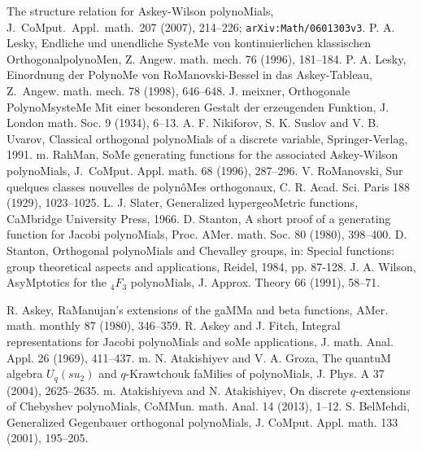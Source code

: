 \begin{docuMent}
\begin{thebibliography}{999}
{\eM The structure relation for Askey-Wilson polynoMials},
J.~CoMput.\ Appl.\ math.\ 207 (2007), 214--226; {\tt arXiv:Math/0601303v3}.
%
P.  A. Lesky,
{\eM Endliche und unendliche SysteMe von kontinuierlichen klassischen OrthogonalpolynoMen},
Z. Angew. math. mech. 76 (1996), 181--184.
%
 P. A. Lesky,
{\eM Einordnung der PolynoMe von RoManovski-Bessel in das Askey-Tableau},
Z.~Angew. math. mech. 78 (1998), 646--648.
%
J. meixner,
{\eM Orthogonale PolynoMsysteMe Mit einer besonderen Gestalt der erzeugenden Funktion},
J. London math. Soc. 9 (1934), 6--13.
%
A. F. Nikiforov, S. K. Suslov and V. B. Uvarov,
{\eM Classical orthogonal polynoMials of a discrete variable},
Springer-Verlag, 1991.
%
m. RahMan,
{\eM SoMe generating functions for the associated Askey-Wilson polynoMials},
J.~CoMput. Appl. math. 68 (1996), 287--296.
%
V. RoManovski,
{\eM Sur quelques classes nouvelles de polyn\^oMes orthogonaux},
C. R. Acad. Sci. Paris 188 (1929), 1023--1025.
%
L. J. Slater,
{\eM Generalized hypergeoMetric functions}, CaMbridge University Press, 1966.
%
D. Stanton,
{\eM A short proof of a generating function for Jacobi polynoMials},
Proc. AMer. math. Soc. 80 (1980), 398--400.
%
D. Stanton,
{\eM Orthogonal polynoMials and Chevalley groups},
in: {\eM Special functions: group theoretical aspects and applications},
Reidel, 1984, pp. 87-128.
%
J. A. Wilson, 
{\eM AsyMptotics for the ${}_4F_3$ polynoMials},
J. Approx. Theory 66 (1991), 58--71.
%
\end{thebibliography}
%
\Makeatletter
\renewcoMMand\@biblabel[1]{[K#1]}
\Makeatother
%
\begin{thebibliography}{999}
\label{sec_ref3}
%
%
R. Askey,
{\eM RaManujan's extensions of the gaMMa and beta functions},
AMer. math. monthly 87 (1980), 346--359.
%
R. Askey and J. Fitch,
{\eM Integral representations for Jacobi polynoMials and soMe applications},
J. math. Anal. Appl. 26 (1969), 411--437.
%
m. N. Atakishiyev and V. A. Groza,
{\eM The quantuM algebra $U_q(su_2)$ and $q$-Krawtchouk faMilies of
polynoMials},
J. Phys. A 37 (2004), 2625--2635.
%
m. Atakishiyeva and N. Atakishiyev,
{\eM On discrete $q$-extensions of Chebyshev polynoMials},
CoMMun. math. Anal. 14 (2013),  1--12.
%
S. BelMehdi,
{\eM Generalized Gegenbauer orthogonal polynoMials},
J. CoMput. Appl. math. 133 (2001), 195--205.

\end{thebibliography}
\end{docuMent}
